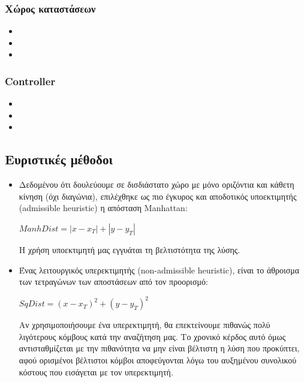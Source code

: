 \documentclass[a4paper,9pt]{article}
\begin{document}
\subsubsection{Χώρος καταστάσεων}
    \begin{itemize}
	\item
	\item
	\item
    \end{itemize}
\subsubsection{Controller}
    \begin{itemize}
	\item
	\item
	\item
    \end{itemize}


\subsection{Ευριστικές μέθοδοι}
\begin{itemize}
\item
Δεδομένου ότι δουλεύουμε σε δισδιάστατο χώρο με μόνο οριζόντια και κάθετη
κίνηση (όχι διαγώνια), επιλέχθηκε ως πιο έγκυρος και αποδοτικός υποεκτιμητής
(admissible heuris{\kern0pt}tic) η απόσταση Manhattan:
\begin{center} $ManhDist = |x - x_T| + |y - y_T|$ \end{center}
Η χρήση υποεκτιμητή μας εγγυάται τη βελτιστότητα της λύσης.

\item
Ένας λειτουργικός υπερεκτιμητής (non-admissible heuris{\kern0pt}tic), είναι το άθροισμα
των τετραγώνων των αποστάσεων από τον προορισμό:
\begin{center} $SqDist = (x - x_T)^2 + (y - y_T)^2$ \end{center}
Αν χρησιμοποιήσουμε ένα υπερεκτιμητή, θα επεκτείνουμε πιθανώς πολύ λιγότερους
κόμβους κατά την αναζήτηση μας. Το χρονικό κέρδος αυτό όμως αντισταθμίζεται με
την πιθανότητα να μην είναι βέλτιστη η λύση που προκύπτει, αφού ορισμένοι
βέλτιστοι κόμβοι αποφεύγονται λόγω του αυξημένου συνολικού κόστους που
εισάγεται με τον υπερεκτιμητή.
\end{itemize}


\end{document}
